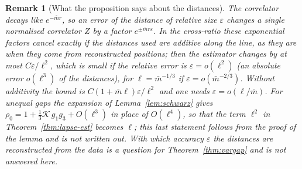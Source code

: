 \documentclass[11pt,a4paper]{article}
\theoremstyle{stmt}
\theoremstyle{defn}
\theoremstyle{rmk}
\newtheorem{remark}[theorem]{Remark}
\numberwithin{equation}{section}
\begin{document}
{\begin{remark}[What the proposition says about the distances]
The correlator decays like $e^{-\bar mr}$, so an error of the distance of relative size $\varepsilon$ changes a single normalised correlator $Z$ by a factor $e^{\pm\bar mr\varepsilon}$. In the cross-ratio these exponential factors cancel exactly if the distances used are additive along the line, as they are when they come from reconstructed positions; then the estimator changes by at most $C\varepsilon/\ell^2$, which is small if the relative error is $\varepsilon=o(\ell^2)$ (an absolute error $o(\ell^3)$ of the distances), for $\ell=\bar m^{-1/3}$ if $\varepsilon=o(\bar m^{-2/3})$. Without additivity the bound is $C(1+\bar m\ell)\varepsilon/\ell^2$ and one needs $\varepsilon=o(\ell/\bar m)$. For unequal gaps the expansion of Lemma~\ref{lem:schwarz} gives $\rho_0=1+\frac13\mathcal K\,g_1g_3+O(\ell^3)$ in place of $O(\ell^4)$, so that the term $\ell^2$ in Theorem~\ref{thm:lapse-est} becomes $\ell$; this last statement follows from the proof of the lemma and is not written out. With which accuracy $\varepsilon$ the distances are reconstructed from the data is a question for Theorem~\ref{thm:vargap} and is not answered here.
\end{remark}

}
\end{document}
